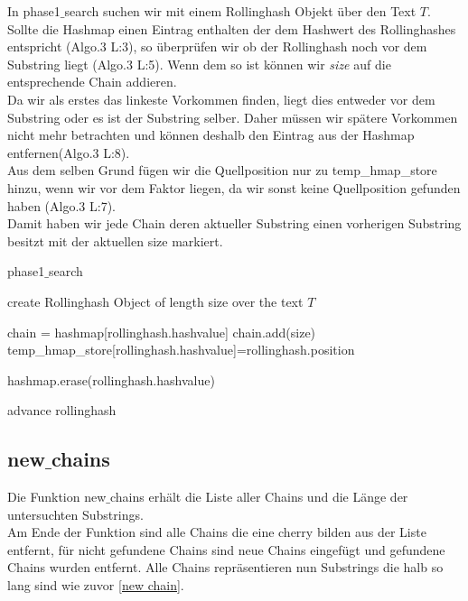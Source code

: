 \noindent
In phase1$\_$search suchen wir mit einem Rollinghash Objekt über den Text $T$.
Sollte die Hashmap einen Eintrag enthalten der dem Hashwert des Rollinghashes entspricht (Algo.3 L:3), so überprüfen wir ob der Rollinghash noch vor dem Substring liegt (Algo.3 L:5). Wenn dem so ist können wir \textit{size} auf die entsprechende Chain addieren.\\
Da wir als erstes das linkeste Vorkommen finden, liegt dies entweder vor dem Substring oder es ist der Substring selber. Daher müssen wir spätere Vorkommen nicht mehr betrachten und können deshalb den Eintrag aus der Hashmap entfernen(Algo.3 L:8).\\
Aus dem selben Grund fügen wir die Quellposition nur zu temp\_hmap\_store hinzu, wenn wir vor dem Faktor liegen, da wir sonst keine Quellposition gefunden haben (Algo.3 L:7).\\
Damit haben wir jede Chain deren aktueller Substring einen vorherigen Substring besitzt mit der aktuellen size markiert.
\begin{algorithm}[hbt!]
	\caption{phase1$\_$search}
	create Rollinghash Object of length size over the text $T$\;
	{
		{
			chain = hashmap[rollinghash.hashvalue]\;
			{chain.add(size)\;
			temp\_hmap\_store[rollinghash.hashvalue]=rollinghash.position\;}
			
				
			hashmap.erase(rollinghash.hashvalue)\;
		}
			advance rollinghash\;
	
	}
\end{algorithm}

\subsection{new$\_$chains}
Die Funktion new$\_$chains erhält die Liste aller Chains und die Länge der untersuchten Substrings.\\
Am Ende der Funktion sind alle Chains die eine cherry bilden aus der Liste entfernt, für nicht gefundene Chains sind neue Chains eingefügt und gefundene Chains wurden entfernt. Alle Chains repräsentieren nun Substrings die halb so lang sind wie zuvor  \autoref{new chain}.\\

